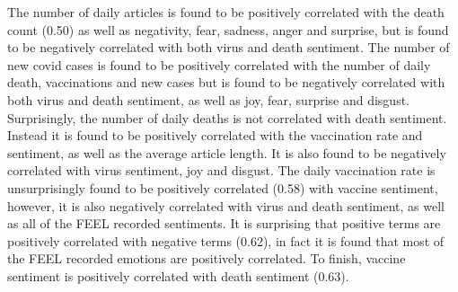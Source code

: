 The number of daily articles is found to be positively correlated with the death count (0.50) as well as negativity, fear, sadness, anger and surprise, but is found to be negatively correlated with both virus and death sentiment. The number of new covid cases is found to be positively correlated with the number of daily death, vaccinations and new cases but is found to be negatively correlated with both virus and death sentiment, as well as joy, fear, surprise and disgust. Surprisingly, the number of daily deaths is not correlated with death sentiment. Instead it is found to be positively correlated with the vaccination rate and sentiment, as well as the average article length. It is also found to be negatively correlated with virus sentiment, joy and disgust. The daily vaccination rate is unsurprisingly found to be positively correlated (0.58) with vaccine sentiment, however, it is also negatively correlated with virus and death sentiment, as well as all of the FEEL recorded sentiments. It is surprising that positive terms are positively correlated with negative terms (0.62), in fact it is found that most of the FEEL recorded emotions are positively correlated. To finish, vaccine sentiment is positively correlated with death sentiment (0.63).

